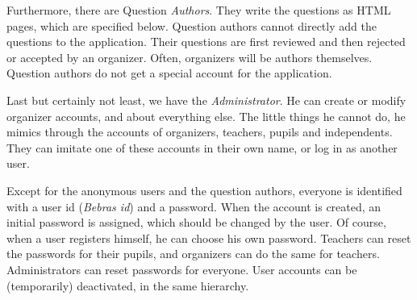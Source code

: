 Furthermore, there are Question \textit{Authors}. They write the questions
as HTML pages, which are specified below. Question authors cannot directly
add the questions to the application. Their questions are first reviewed and
then rejected or accepted by an organizer. Often, organizers will be authors
themselves. Question authors do not get a special account for the application.

Last but certainly not least, we have the \textit{Administrator}. He can create
or modify organizer accounts, and about everything else. The little things he
cannot do, he mimics through the accounts of organizers, teachers, pupils and
independents. They can imitate one of these accounts in their own name, or
log in as another user.

Except for the anonymous users and the question authors, everyone is identified
with a user id (\textit{Bebras id}) and a password. When the account is
created, an initial password is assigned, which should be changed by the user.
Of course, when a user registers himself, he can choose his own password.
Teachers can reset the passwords for their pupils, and organizers can do the
same for teachers. Administrators can reset passwords for everyone. User
accounts can be (temporarily) deactivated, in the same hierarchy.
